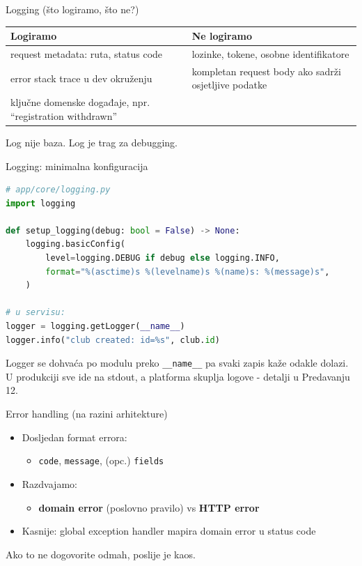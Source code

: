 \begin{frame}{Logging (što logiramo, što ne?)}
\begin{tabular}{@{}p{5.2cm}p{5.2cm}@{}}
  \toprule
  \textbf{Logiramo} & \textbf{Ne logiramo} \\
  \midrule
  request metadata: ruta, status code & lozinke, tokene, osobne identifikatore \\
  \midrule
  error stack trace u dev okruženju & kompletan request body ako sadrži osjetljive podatke \\
  \midrule
  ključne domenske događaje, npr. \enquote{registration withdrawn} & \\
  \bottomrule
\end{tabular}

\vspace{0.6em}
Log nije baza. Log je trag za debugging.
\end{frame}

\begin{frame}[fragile,shrink=5]{Logging: minimalna konfiguracija}
\begin{lstlisting}[language=python]
# app/core/logging.py
import logging

def setup_logging(debug: bool = False) -> None:
    logging.basicConfig(
        level=logging.DEBUG if debug else logging.INFO,
        format="%(asctime)s %(levelname)s %(name)s: %(message)s",
    )

# u servisu:
logger = logging.getLogger(__name__)
logger.info("club created: id=%s", club.id)
\end{lstlisting}

\vspace{0.4em}
Logger se dohvaća po modulu preko \texttt{\_\_name\_\_} pa svaki zapis kaže odakle dolazi. U produkciji sve ide na stdout, a platforma skuplja logove - detalji u Predavanju 12.
\end{frame}

\begin{frame}{Error handling (na razini arhitekture)}
\begin{itemize}
  \item Dosljedan format errora:
  \begin{itemize}
    \item \texttt{code}, \texttt{message}, (opc.) \texttt{fields}
  \end{itemize}
  \item Razdvajamo:
  \begin{itemize}
    \item \textbf{domain error} (poslovno pravilo) vs \textbf{HTTP error}
  \end{itemize}
  \item Kasnije: global exception handler mapira domain error u status code
\end{itemize}

\vspace{0.6em}
Ako to ne dogovorite odmah, poslije je kaos.
\end{frame}

